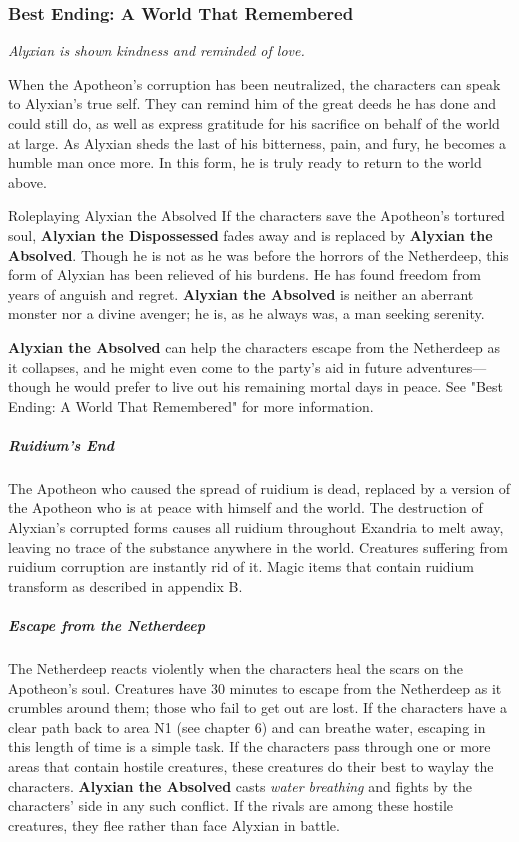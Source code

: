 \documentclass[10pt,a4paper,twoside,fancy,bg=print,twocolumn,openany,nodeprecatedcode]{dndbook}
\begin{document}
\subsubsection{Best Ending: A World That Remembered}
\textit{Alyxian is shown kindness and reminded of love.}

When the Apotheon's corruption has been neutralized, the characters can speak to Alyxian's true self. They can remind him of the great deeds he has done and could still do, as well as express gratitude for his sacrifice on behalf of the world at large. As Alyxian sheds the last of his bitterness, pain, and fury, he becomes a humble man once more. In this form, he is truly ready to return to the world above.

\begin{DndSidebar}[float=!b]{Roleplaying Alyxian the Absolved}
If the characters save the Apotheon's tortured soul, \textbf{Alyxian the Dispossessed} fades away and is replaced by \textbf{Alyxian the Absolved}. Though he is not as he was before the horrors of the Netherdeep, this form of Alyxian has been relieved of his burdens. He has found freedom from years of anguish and regret. \textbf{Alyxian the Absolved} is neither an aberrant monster nor a divine avenger; he is, as he always was, a man seeking serenity.



\textbf{Alyxian the Absolved} can help the characters escape from the Netherdeep as it collapses, and he might even come to the party's aid in future adventures—though he would prefer to live out his remaining mortal days in peace. See "Best Ending: A World That Remembered" for more information.



\end{DndSidebar}

\subparagraph{Ruidium's End}
The Apotheon who caused the spread of ruidium is dead, replaced by a version of the Apotheon who is at peace with himself and the world. The destruction of Alyxian's corrupted forms causes all ruidium throughout Exandria to melt away, leaving no trace of the substance anywhere in the world. Creatures suffering from ruidium corruption are instantly rid of it. Magic items that contain ruidium transform as described in appendix B.

\subparagraph{Escape from the Netherdeep}
The Netherdeep reacts violently when the characters heal the scars on the Apotheon's soul. Creatures have 30 minutes to escape from the Netherdeep as it crumbles around them; those who fail to get out are lost. If the characters have a clear path back to area N1 (see chapter 6) and can breathe water, escaping in this length of time is a simple task. If the characters pass through one or more areas that contain hostile creatures, these creatures do their best to waylay the characters. \textbf{Alyxian the Absolved} casts \textit{water breathing} and fights by the characters' side in any such conflict. If the rivals are among these hostile creatures, they flee rather than face Alyxian in battle.
\end{document}
